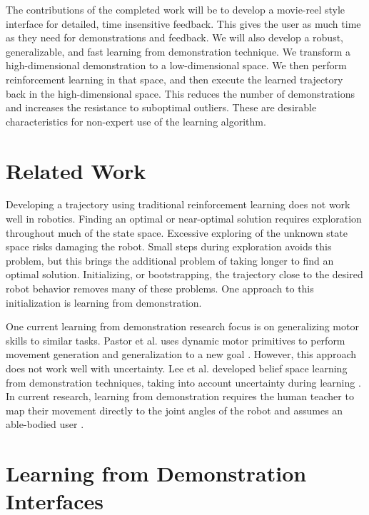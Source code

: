 \documentclass{sig-alternate-2013}
\begin{document}
The contributions of the completed work will be to develop a movie-reel style interface for detailed, time insensitive feedback. This gives the user as much time as they need for demonstrations and feedback. We will also develop a robust, generalizable, and fast learning from demonstration technique. We transform a high-dimensional demonstration to a low-dimensional space. We then perform reinforcement learning in that space, and then execute the learned trajectory back in the high-dimensional space. This reduces the number of demonstrations and increases the resistance to suboptimal outliers. These are desirable characteristics for non-expert use of the learning algorithm.

\section{Related Work}
Developing a trajectory using traditional reinforcement learning does not work well in robotics. Finding an optimal or near-optimal solution requires exploration throughout much of the state space. Excessive exploring of the unknown state space risks damaging the robot. Small steps during exploration avoids this problem, but this brings the additional problem of taking longer to find an optimal solution. Initializing, or bootstrapping, the trajectory close to the desired robot behavior removes many of these problems. One approach to this initialization is learning from demonstration.

One current learning from demonstration research focus is on generalizing motor skills to similar tasks. Pastor et al. uses dynamic motor primitives to perform movement generation and generalization to a new goal \cite{Pastor_ICRA_2009}. However, this approach does not work well with uncertainty. Lee et al. developed belief space learning from demonstration techniques, taking into account uncertainty during learning \cite{Leeetal_IROS2013}. In current research, learning from demonstration requires the human teacher to map their movement directly to the joint angles of the robot and assumes an able-bodied user \cite{Bagnell_2013_7451}.

\section{Learning from Demonstration Interfaces}
\label{Learning by Demonstration}
\end{document}
